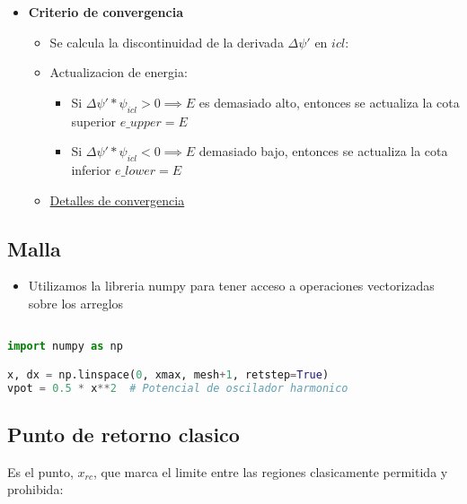 \documentclass[11pt]{article}
\begin{document}
\begin{itemize}
\item \textbf{Criterio de convergencia}

\begin{itemize}
\item Se calcula la discontinuidad de la derivada \(\Delta \psi'\) en \(icl\):

\item Actualizacion de energia:
\begin{itemize}
\item Si \(\Delta \psi' * \psi_{icl} > 0 \implies E\) es demasiado alto, entonces se actualiza la cota superior \(e\_upper = E\)
\item Si \(\Delta \psi' * \psi_{icl} < 0 \implies E\) demasiado bajo, entonces se actualiza la cota inferior \(e\_lower = E\)
\end{itemize}

\item \hyperref[sec:org2c822a5]{Detalles de convergencia}
\end{itemize}
\end{itemize}
\subsection{Malla}
\label{sec:orgdb4bc66}

\begin{itemize}
\item Utilizamos la libreria numpy para tener acceso a operaciones vectorizadas sobre los arreglos
\end{itemize}

\begin{lstlisting}[language=Python,numbers=none]

import numpy as np

x, dx = np.linspace(0, xmax, mesh+1, retstep=True)
vpot = 0.5 * x**2  # Potencial de oscilador harmonico

\end{lstlisting}
\subsection{Punto de retorno clasico}
\label{sec:org7b13b2c}

Es el punto, \(x_{rc}\), que marca el limite entre las regiones clasicamente permitida y prohibida:
\end{document}
